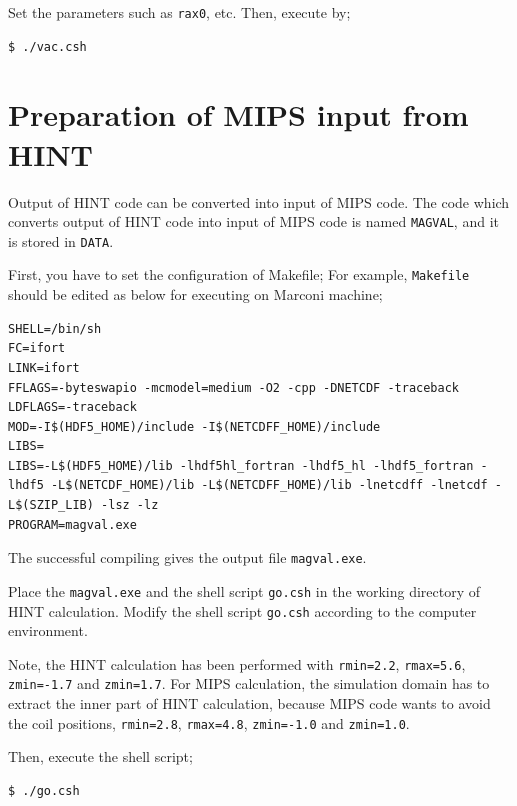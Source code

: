 \documentclass[10pt]{ltxdoc} %
\begin{document}
Set the parameters such as \texttt{rax0}, etc. Then, execute by;
\vspace{-2mm}
\begin{verbatim}
$ ./vac.csh 
\end{verbatim}
\vspace{2mm}


\section{Preparation of MIPS input from HINT}
Output of HINT code can be converted into input of MIPS code. 
The code which converts output of HINT code into input of MIPS code is named \texttt{MAGVAL}, and it is stored in \texttt{DATA}. 

First, you have to set the configuration of Makefile;
For example, \texttt{Makefile} should be edited as below for executing on Marconi machine;
\vspace{2mm}
\begin{verbatim}
SHELL=/bin/sh
FC=ifort
LINK=ifort
FFLAGS=-byteswapio -mcmodel=medium -O2 -cpp -DNETCDF -traceback
LDFLAGS=-traceback
MOD=-I$(HDF5_HOME)/include -I$(NETCDFF_HOME)/include
LIBS=
LIBS=-L$(HDF5_HOME)/lib -lhdf5hl_fortran -lhdf5_hl -lhdf5_fortran -lhdf5 -L$(NETCDF_HOME)/lib -L$(NETCDFF_HOME)/lib -lnetcdff -lnetcdf -L$(SZIP_LIB) -lsz -lz
PROGRAM=magval.exe
\end{verbatim}
\vspace{2mm}

The successful compiling gives the output file \texttt{magval.exe}. 

Place the \texttt{magval.exe} and the shell script \texttt{go.csh} in the working directory of HINT calculation. 
Modify the shell script \texttt{go.csh} according to the computer environment. 

Note, the HINT calculation has been performed with \texttt{rmin=2.2},  \texttt{rmax=5.6},  \texttt{zmin=-1.7} and \texttt{zmin=1.7}. 
For MIPS calculation, the simulation domain has to extract the inner part of HINT calculation, because MIPS code wants to avoid the coil positions, \texttt{rmin=2.8},  \texttt{rmax=4.8},  \texttt{zmin=-1.0} and \texttt{zmin=1.0}.


Then, execute the shell script;
\vspace{0mm}
\begin{verbatim}
$ ./go.csh 
\end{verbatim}
\vspace{5mm}
\end{document}
